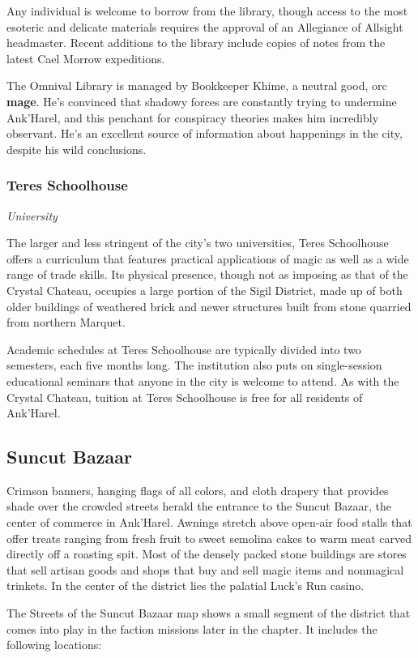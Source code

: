 \documentclass[10pt,a4paper,twoside,bg=print,twocolumn,openany,nodeprecatedcode]{dndbook}
\begin{document}
Any individual is welcome to borrow from the library, though access to the most esoteric and delicate materials requires the approval of an Allegiance of Allsight headmaster. Recent additions to the library include copies of notes from the latest Cael Morrow expeditions.

The Omnival Library is managed by Bookkeeper Khime, a neutral good, orc \textbf{mage}. He's convinced that shadowy forces are constantly trying to undermine Ank'Harel, and this penchant for conspiracy theories makes him incredibly observant. He's an excellent source of information about happenings in the city, despite his wild conclusions.

\subsubsection{Teres Schoolhouse}
\textit{University}

The larger and less stringent of the city's two universities, Teres Schoolhouse offers a curriculum that features practical applications of magic as well as a wide range of trade skills. Its physical presence, though not as imposing as that of the Crystal Chateau, occupies a large portion of the Sigil District, made up of both older buildings of weathered brick and newer structures built from stone quarried from northern Marquet.

Academic schedules at Teres Schoolhouse are typically divided into two semesters, each five months long. The institution also puts on single-session educational seminars that anyone in the city is welcome to attend. As with the Crystal Chateau, tuition at Teres Schoolhouse is free for all residents of Ank'Harel.

\subsection{Suncut Bazaar}
Crimson banners, hanging flags of all colors, and cloth drapery that provides shade over the crowded streets herald the entrance to the Suncut Bazaar, the center of commerce in Ank'Harel. Awnings stretch above open-air food stalls that offer treats ranging from fresh fruit to sweet semolina cakes to warm meat carved directly off a roasting spit. Most of the densely packed stone buildings are stores that sell artisan goods and shops that buy and sell magic items and nonmagical trinkets. In the center of the district lies the palatial Luck's Run casino.

The Streets of the Suncut Bazaar map shows a small segment of the district that comes into play in the faction missions later in the chapter. It includes the following locations:
\end{document}
